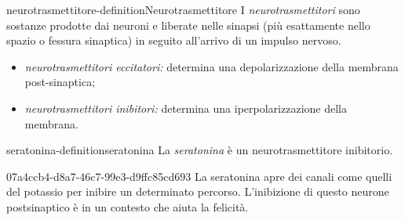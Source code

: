 \documentclass[preview]{standalone}
\begin{document}
\begin{snippetdefinition}{neurotrasmettitore-definition}{Neurotrasmettitore}
    I \textit{neurotrasmettitori} sono sostanze prodotte dai neuroni e liberate nelle sinapsi (più
    esattamente nello spazio o fessura sinaptica) in seguito all'arrivo di un impulso nervoso.
    \begin{itemize}
        \item \textit{neurotrasmettitori eccitatori:} determina una depolarizzazione della membrana post-sinaptica;
        \item \textit{neurotrasmettitori inibitori:} determina una iperpolarizzazione della membrana.
    \end{itemize}
\end{snippetdefinition}

\begin{snippetdefinition}{seratonina-definition}{seratonina}
    La \textit{seratonina} è un neurotrasmettitore inibitorio.
\end{snippetdefinition}

\begin{snippet}{07a4ccb4-d8a7-46c7-99e3-d9ffc85cd693}
    La seratonina apre dei canali come quelli del potassio per inibire un determinato percorso.
L'inibizione di questo neurone postsinaptico è in un contesto che aiuta la felicità.
\end{snippet}
\end{document}
